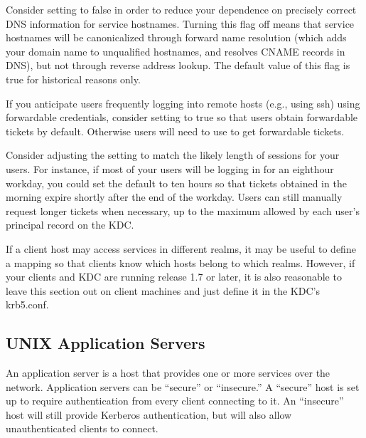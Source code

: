\documentclass[letterpaper,10pt,english]{sphinxmanual}
\begin{document}
\sphinxAtStartPar
Consider setting  to false in order to reduce your dependence
on precisely correct DNS information for service hostnames.  Turning
this flag off means that service hostnames will be canonicalized
through forward name resolution (which adds your domain name to
unqualified hostnames, and resolves CNAME records in DNS), but not
through reverse address lookup.  The default value of this flag is
true for historical reasons only.

\sphinxAtStartPar
If you anticipate users frequently logging into remote hosts
(e.g., using ssh) using forwardable credentials, consider setting
 to true so that users obtain forwardable tickets by
default.  Otherwise users will need to use  to get
forwardable tickets.

\sphinxAtStartPar
Consider adjusting the  setting to match the likely
length of sessions for your users.  For instance, if most of your
users will be logging in for an eight\sphinxhyphen{}hour workday, you could set the
default to ten hours so that tickets obtained in the morning expire
shortly after the end of the workday.  Users can still manually
request longer tickets when necessary, up to the maximum allowed by
each user’s principal record on the KDC.

\sphinxAtStartPar
If a client host may access services in different realms, it may be
useful to define a {\hyperref[\detokenize{admin/conf_files/krb5_conf:domain-realm}]{}} mapping so that clients know
which hosts belong to which realms.  However, if your clients and KDC
are running release 1.7 or later, it is also reasonable to leave this
section out on client machines and just define it in the KDC’s
krb5.conf.


\subsection{UNIX Application Servers}
\label{\detokenize{admin/install_appl_srv:unix-application-servers}}\label{\detokenize{admin/install_appl_srv::doc}}
\sphinxAtStartPar
An application server is a host that provides one or more services
over the network.  Application servers can be “secure” or “insecure.”
A “secure” host is set up to require authentication from every client
connecting to it.  An “insecure” host will still provide Kerberos
authentication, but will also allow unauthenticated clients to
connect.
\end{document}
